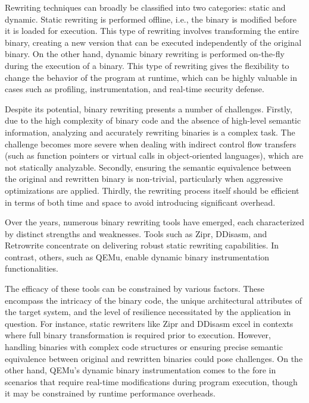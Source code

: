 \documentclass[a4paper,11pt,oneside]{report}
\begin{document}
Rewriting techniques can broadly be classified into two categories: static and
dynamic. Static rewriting is performed offline, i.e., the binary is modified before it is loaded
for execution. This type of rewriting involves transforming the entire binary, creating a new
version that can be executed independently of the original binary. On the other hand,
dynamic binary rewriting is performed on-the-fly during the execution of a binary. This type
of rewriting gives the flexibility to change the behavior of the program at runtime, which can
be highly valuable in cases such as profiling, instrumentation, and real-time security
defense.

Despite its potential, binary rewriting presents a number of challenges. Firstly, due
to the high complexity of binary code and the absence of high-level semantic information,
analyzing and accurately rewriting binaries is a complex task. The challenge becomes more
severe when dealing with indirect control flow transfers (such as function pointers or virtual
calls in object-oriented languages), which are not statically analyzable. Secondly, ensuring
the semantic equivalence between the original and rewritten binary is non-trivial,
particularly when aggressive optimizations are applied. Thirdly, the rewriting process itself
should be efficient in terms of both time and space to avoid introducing significant
overhead.

Over the years, numerous binary rewriting tools have emerged, each characterized
by distinct strengths and weaknesses. Tools such as Zipr, DDisasm, and Retrowrite
concentrate on delivering robust static rewriting capabilities. In contrast, others, such as
QEMu, enable dynamic binary instrumentation functionalities.

The efficacy of these tools can be constrained by various factors. These encompass
the intricacy of the binary code, the unique architectural attributes of the target system,
and the level of resilience necessitated by the application in question. For instance, static
rewriters like Zipr and DDisasm excel in contexts where full binary transformation is
required prior to execution. However, handling binaries with complex code structures or
ensuring precise semantic equivalence between original and rewritten binaries could pose
challenges. On the other hand, QEMu's dynamic binary instrumentation comes to the fore in
scenarios that require real-time modifications during program execution, though it may be
constrained by runtime performance overheads.
\end{document}
